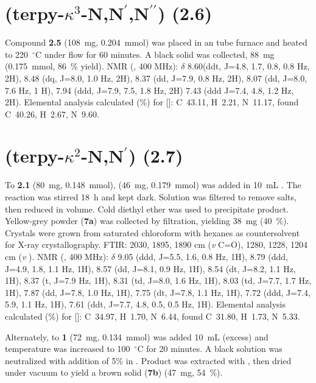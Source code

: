 \section{(terpy-$\kappa^3$-N,N$^\prime$,N$^{\prime \prime}$) (2.6)} \label{sec.c6}
Compound \textbf{2.5} (108~mg, 0.204~mmol) was placed in an tube furnace and heated to 220~$^\circ$C under  flow for 60 minutes. A black solid was collected, 88~mg (0.175~mmol, 86~\% yield).  NMR (, 400 MHz): $\delta$ 8.60(ddt, J=4.8, 1.7, 0.8, 0.8 Hz, 2H), 8.48 (dq, J=8.0, 1.0 Hz, 2H), 8.37 (dd, J=7.9, 0.8 Hz, 2H), 8.07 (dd, J=8.0, 7.6 Hz, 1 H), 7.94 (ddd, J=7.9, 7.5, 1.8 Hz, 2H) 7.43 (ddd J=7.4, 4.8, 1.2 Hz, 2H). Elemental analysis calculated (\%) for []: C~43.11, H~2.21, N~11.17, found C~40.26, H~2.67, N~9.60.

\section{(terpy-$\kappa^2$-N,N$^\prime$) (2.7)}\label{sec.c7}
To \textbf{2.1} (80~mg, 0.148~mmol),  (46~mg, 0.179~mmol) was added in 10~mL . The reaction was stirred 18~h and kept dark. Solution was filtered to remove salts, then reduced in volume. Cold diethyl ether was used to precipitate product. Yellow-grey powder (\textbf{7a}) was collected by filtration, yielding 38~mg (40~\%). Crystals were grown from saturated chloroform with hexanes as countersolvent for X-ray crystallography. FTIR: 2030, 1895, 1890 cm (\textit{v} C=O), 1280, 1228, 1204 cm (\textit{v} ).  NMR (, 400 MHz): $\delta$ 9.05 (ddd, J=5.5, 1.6, 0.8 Hz, 1H), 8.79 (ddd, J=4.9, 1.8, 1.1 Hz, 1H), 8.57 (dd, J=8.1, 0.9 Hz, 1H), 8.54 (dt, J=8.2, 1.1 Hz, 1H), 8.37 (t, J=7.9 Hz, 1H), 8.31 (td, J=8.0, 1.6 Hz, 1H), 8.03 (td, J=7.7, 1.7 Hz, 1H), 7.87 (dd, J=7.8, 1.0 Hz, 1H), 7.75 (dt, J=7.8, 1.1 Hz, 1H), 7.72 (ddd, J=7.4, 5.9, 1.1 Hz, 1H), 7.61 (ddt, J=7.7, 4.8, 0.5, 0.5 Hz, 1H).  Elemental analysis calculated (\%) for []: C~34.97, H~1.70, N~6.44, found C~31.80, H~1.73, N~5.33.

Alternately, to \textbf{1} (72~mg, 0.134~mmol) was added 10~mL  (excess) and temperature was increased to 100~$^\circ$C for 20 minutes. A black solution was neutralized with addition of 5\%  in . Product was extracted with , then dried under vacuum to yield a brown solid (\textbf{7b}) (47~mg, 54~\%).

